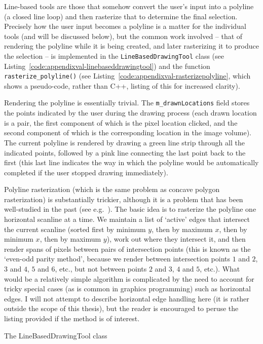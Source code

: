 Line-based tools are those that somehow convert the user's input into a polyline (a closed line loop) and then rasterize that to determine the final selection. Precisely how the user input becomes a polyline is a matter for the individual tools (and will be discussed below), but the common work involved -- that of rendering the polyline while it is being created, and later rasterizing it to produce the selection -- is implemented in the \texttt{LineBasedDrawingTool} class (see Listing~\ref{code:appendixval-linebaseddrawingtool}) and the function \texttt{rasterize_polyline()} (see Listing~\ref{code:appendixval-rasterizepolyline}, which shows a pseudo-code, rather than C++, listing of this for increased clarity).

Rendering the polyline is essentially trivial. The \texttt{m_drawnLocations} field stores the points indicated by the user during the drawing process (each drawn location is a pair, the first component of which is the pixel location clicked, and the second component of which is the corresponding location in the image volume). The current polyline is rendered by drawing a green line strip through all the indicated points, followed by a pink line connecting the last point back to the first (this last line indicates the way in which the polyline would be automatically completed if the user stopped drawing immediately).

Polyline rasterization (which is the same problem as concave polygon rasterization) is substantially trickier, although it is a problem that has been well-studied in the past (see e.g.~\cite{heckbert90}). The basic idea is to rasterize the polyline one horizontal scanline at a time. We maintain a list of `active' edges that intersect the current scanline (sorted first by minimum $y$, then by maximum $x$, then by minimum $x$, then by maximum $y$), work out where they intersect it, and then render spans of pixels between pairs of intersection points (this is known as the `even-odd parity method', because we render between intersection points $1$ and $2$, $3$ and $4$, $5$ and $6$, etc., but not between points $2$ and $3$, $4$ and $5$, etc.). What would be a relatively simple algorithm is complicated by the need to account for tricky special cases (as is common in graphics programming) such as horizontal edges. I will not attempt to describe horizontal edge handling here (it is rather outside the scope of this thesis), but the reader is encouraged to peruse the listing provided if the method is of interest.

\begin{stulisting}[p]
\caption{The LineBasedDrawingTool class}
\label{code:appendixval-linebaseddrawingtool}

\end{stulisting}

